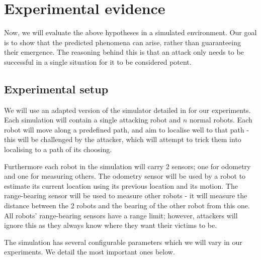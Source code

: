 \section{Experimental evidence}

Now, we will evaluate the above hypotheses in a simulated environment. Our goal is to show that the predicted phenomena can arise, rather than guaranteeing their emergence. The reasoning behind this is that an attack only needs to be successful in a single situation for it to be considered potent.

\subsection{Experimental setup}
We will use an adapted version of the simulator detailed in \cite[RobotWeb]{Robotweb} for our experiments. Each simulation will contain a single attacking robot and $n$ normal robots. Each robot will move along a predefined path, and aim to localise well to that path - this will be challenged by the attacker, which will attempt to trick them into localising to a path of its choosing.

Furthermore each robot in the simulation will carry 2 sensors; one for odometry and one for measuring others. The odometry sensor will be used by a robot to estimate its current location using its previous location and its motion. The range-bearing sensor will be used to measure other robots - it will measure the distance between the 2 robots and the bearing of the other robot from this one. All robots' range-bearing sensors have a range limit; however, attackers will ignore this as they always know where they want their victims to be.

The simulation has several configurable parameters which we will vary in our experiments. We detail the most important ones below.

